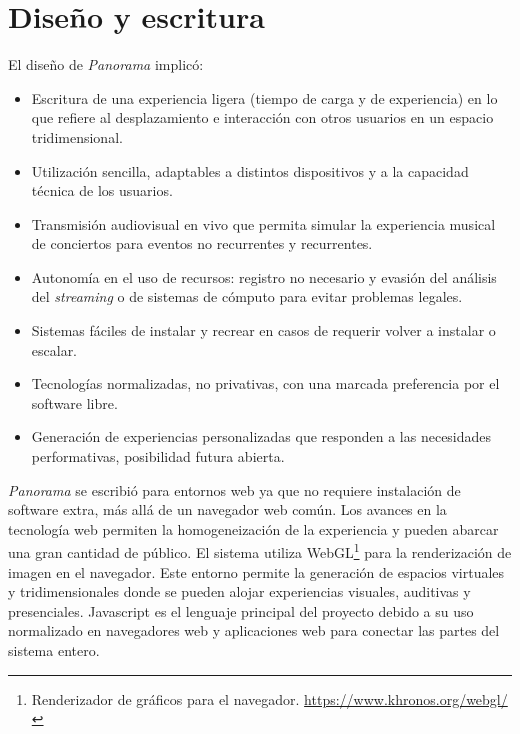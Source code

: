 
\section*{Diseño y escritura} %

El diseño de \textit{Panorama} implicó:

\begin{itemize}
\item Escritura de una experiencia ligera (tiempo de carga y de experiencia) en lo que refiere al desplazamiento e interacción con otros usuarios en un espacio tridimensional. 
\item Utilización sencilla, adaptables a distintos dispositivos y a la capacidad técnica de los usuarios.
\item Transmisión audiovisual en vivo que permita simular la experiencia musical de conciertos para eventos no recurrentes y recurrentes. 
\item Autonomía en el uso de recursos: registro no necesario y evasión del análisis del \textit{streaming} o de sistemas de cómputo para evitar problemas legales. 
\item Sistemas fáciles de instalar y recrear en casos de requerir volver a instalar o escalar.
\item Tecnologías normalizadas, no privativas, con una marcada preferencia por el software libre.
\item Generación de experiencias personalizadas que responden a las necesidades performativas, posibilidad futura abierta. 
\end{itemize}

\textit{Panorama} se escribió para entornos web ya que no requiere instalación de software extra, más allá de un navegador web común. Los avances en la tecnología web permiten la homogeneización de la experiencia y pueden abarcar una gran cantidad de público. El sistema utiliza WebGL\footnote{Renderizador de gráficos para el navegador. \url{https://www.khronos.org/webgl/}} para la renderización de imagen en el navegador. Este entorno permite la generación de espacios virtuales y tridimensionales donde se pueden alojar experiencias visuales, auditivas y presenciales. Javascript es el lenguaje principal del proyecto debido a su uso normalizado en navegadores web y aplicaciones web para conectar las partes del sistema entero.


